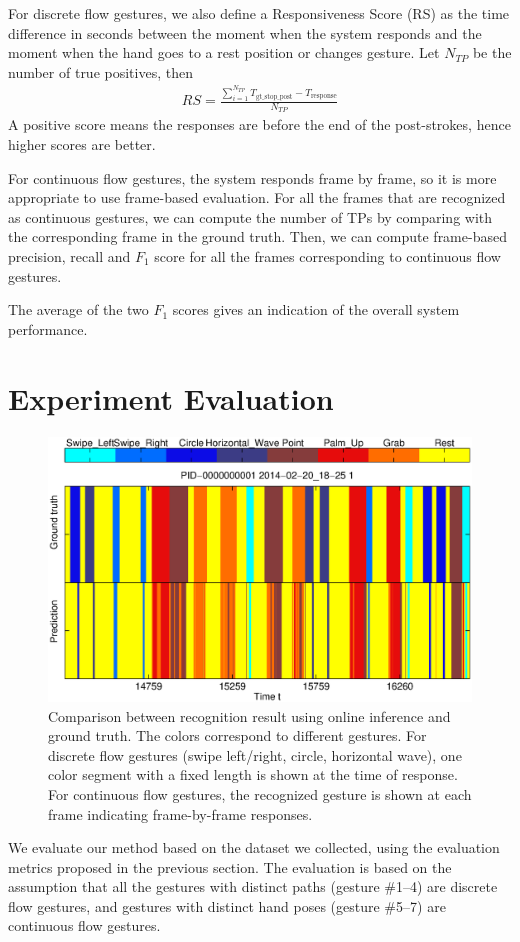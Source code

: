 \documentclass[conference]{IEEEtran}
\begin{document}
For discrete flow gestures, we also define a Responsiveness Score (RS) as the
time difference in seconds between the moment when the system responds and the moment when the hand goes to a rest
position or changes gesture. Let $N_{TP}$ be the number of true positives, then
\begin{align}
RS = \frac{\sum_{i = 1}^{N_{TP}}T_{{\text{gt\_stop\_post}}} -
T_{\text{response}}}{N_{TP}}
\end{align}
A positive score means the responses are before the end of the post-strokes,
hence higher scores are better.

For continuous flow gestures, the system responds frame by frame,
so it is more appropriate to use frame-based evaluation. For all the frames that are
recognized as continuous gestures, we can compute the number of TPs by
comparing with the corresponding frame in the ground truth. Then, we can
compute frame-based precision, recall and $F_1$ score for all the frames
corresponding to continuous flow gestures.

The average of the two $F_1$ scores gives an indication of the overall system
performance.

\section{Experiment Evaluation}\label{sec:evaluation}
\begin{figure}[t]
\centering
\includegraphics[trim=10mm 5mm 10mm 5mm, clip,
width=\columnwidth]{fig/recog_result_m3.eps}
\caption{Comparison between recognition result using online inference
and ground truth.
The colors correspond to different gestures. For discrete flow gestures
(swipe left/right, circle, horizontal wave), one color segment with a fixed
length is shown at the time of response. For continuous flow gestures, the
recognized gesture is shown at each frame indicating frame-by-frame responses.}
\label{fig:recog-result}
\end{figure}
We evaluate our method based on the dataset we collected, using the
evaluation metrics proposed in the previous section. The evaluation is based
on the assumption that all the gestures with distinct paths (gesture \#1--4)
are discrete flow gestures, and gestures with distinct hand poses (gesture
\#5--7) are continuous flow gestures. 
\end{document}
